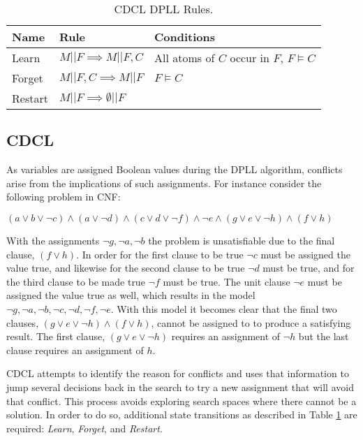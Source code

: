 \documentclass[]{final_report}
\begin{document}
\begin{table}[t]
\centering
\begin{tabular}{|l|l|l|}
\hline
Name & Rule & Conditions  \\ \hline
Learn & $M|| F \implies M || F, C$ & All atoms of $C$ occur in $F$, $F \models C$  \\ \hline
Forget & $M|| F, C \implies M || F $ & $F \models C$  \\ \hline
Restart & $M|| F \implies \emptyset || F$ &  \\ \hline
\end{tabular}
\caption{CDCL DPLL Rules.}
\label{table:cdcl-rules}
\end{table}

\subsection{CDCL}
As variables are assigned Boolean values during the DPLL algorithm, conflicts arise from the implications of such assignments. For instance consider the following problem in CNF:

$(a \lor b \lor \lnot c) \land (a \lor \lnot d) \land (c \lor d \lor \lnot{f}) \land \lnot{e} \land (g \lor e \lor \lnot h) \land (f \lor h)$

With the assignments $\lnot{g}, \lnot{a}, \lnot{b}$ the problem is unsatisfiable due to the final clause, $(f \lor h)$. In order for the first clause to be true $\lnot c$ must be assigned the value true, and likewise for the second clause to be true $\lnot d$ must be true, and for the third clause to be made true $\lnot{f}$ must be true. The unit clause $\lnot{e}$ must be assigned the value true as well, which results in the model $\lnot{g}, \lnot{a}, \lnot{b}, \lnot{c}, \lnot{d}, \lnot{f}, \lnot{e}$. With this model it becomes clear that the final two clauses, $(g \lor e \lor \lnot h) \land (f \lor h)$, cannot be assigned to to produce a satisfying result. The first clause, $(g \lor e \lor \lnot h)$ requires an assignment of $\lnot{h}$ but the last clause requires an assignment of $h$.

CDCL attempts to identify the reason for conflicts and uses that information to jump several decisions back in the search to try a new assignment that will avoid that conflict. This process avoids exploring search spaces where there cannot be a solution. In order to do so, additional state transitions as described in Table \ref{table:cdcl-rules} are required: \textit{Learn}, \textit{Forget}, and \textit{Restart}.
\end{document}
